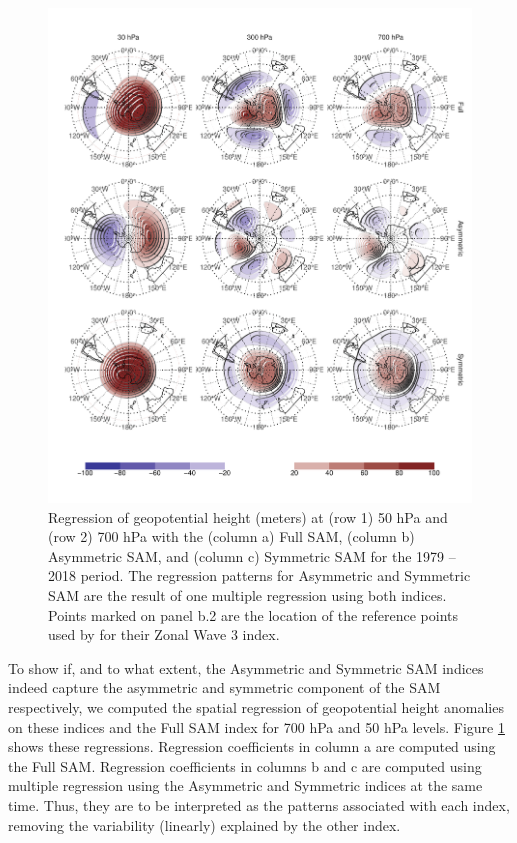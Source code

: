 \documentclass[smallextended]{svjour3}       %
\begin{document}
\begin{figure}
\includegraphics{figures/2d-regr-1} \caption{Regression of geopotential height (meters) at (row 1) 50 hPa and (row 2) 700 hPa with the (column a) Full SAM, (column b) Asymmetric SAM, and (column c) Symmetric SAM for the 1979 -- 2018 period. The regression patterns for Asymmetric and Symmetric SAM are the result of one multiple regression using both indices. Points marked on panel b.2 are the location of the reference points used by \cite{raphael2004} for their Zonal Wave 3 index. }\label{fig:2d-regr}
\end{figure}

To show if, and to what extent, the Asymmetric and Symmetric SAM indices indeed capture the asymmetric and symmetric component of the SAM respectively, we computed the spatial regression of geopotential height anomalies on these indices and the Full SAM index for 700 hPa and 50 hPa levels. Figure \ref{fig:2d-regr} shows these regressions. Regression coefficients in column a are computed using the Full SAM. Regression coefficients in columns b and c are computed using multiple regression using the Asymmetric and Symmetric indices at the same time. Thus, they are to be interpreted as the patterns associated with each index, removing the variability (linearly) explained by the other index.
\end{document}
